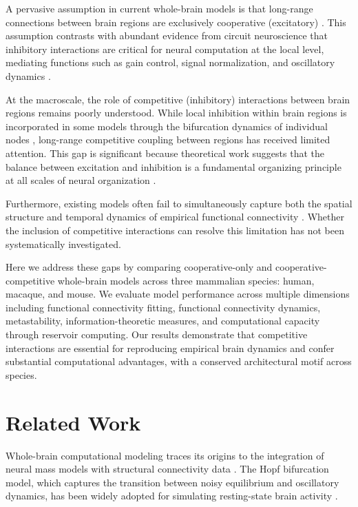 \documentclass[11pt]{article}
\begin{document}
A pervasive assumption in current whole-brain models is that long-range connections between brain regions are exclusively cooperative (excitatory) \citep{deco2013resting, demirtas2019hierarchical}. This assumption contrasts with abundant evidence from circuit neuroscience that inhibitory interactions are critical for neural computation at the local level, mediating functions such as gain control, signal normalization, and oscillatory dynamics \citep{isaacson2011interneurons, kepecs2014interneuron}.

At the macroscale, the role of competitive (inhibitory) interactions between brain regions remains poorly understood. While local inhibition within brain regions is incorporated in some models through the bifurcation dynamics of individual nodes \citep{deco2014local}, long-range competitive coupling between regions has received limited attention. This gap is significant because theoretical work suggests that the balance between excitation and inhibition is a fundamental organizing principle at all scales of neural organization \citep{vreeswijk1996chaos, brunel2000dynamics}.

Furthermore, existing models often fail to simultaneously capture both the spatial structure and temporal dynamics of empirical functional connectivity \citep{hansen2015functional}. Whether the inclusion of competitive interactions can resolve this limitation has not been systematically investigated.

Here we address these gaps by comparing cooperative-only and cooperative-competitive whole-brain models across three mammalian species: human, macaque, and mouse. We evaluate model performance across multiple dimensions including functional connectivity fitting, functional connectivity dynamics, metastability, information-theoretic measures, and computational capacity through reservoir computing. Our results demonstrate that competitive interactions are essential for reproducing empirical brain dynamics and confer substantial computational advantages, with a conserved architectural motif across species.

\section{Related Work}

Whole-brain computational modeling traces its origins to the integration of neural mass models with structural connectivity data \citep{honey2009predicting, ghosh2008noise}. The Hopf bifurcation model, which captures the transition between noisy equilibrium and oscillatory dynamics, has been widely adopted for simulating resting-state brain activity \citep{deco2017single, freyer2011biophysical}.
\end{document}
